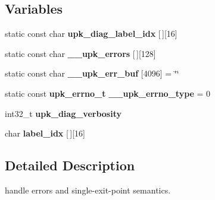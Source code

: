 \subsection*{Variables}
\begin{DoxyCompactItemize}
\item 
static const char {\bf upk\_\-diag\_\-label\_\-idx} [$\,$][16]
\item 
static const char {\bf \_\-\_\-upk\_\-errors} [$\,$][128]
\item 
static const char {\bf \_\-\_\-upk\_\-err\_\-buf} [4096] = \char`\"{}\char`\"{}
\item 
static const {\bf upk\_\-errno\_\-t} {\bf \_\-\_\-upk\_\-errno\_\-type} = 0
\item 
int32\_\-t {\bf upk\_\-diag\_\-verbosity}
\item 
char {\bf label\_\-idx} [$\,$][16]
\end{DoxyCompactItemize}


\subsection{Detailed Description}
handle errors and single-\/exit-\/point semantics. 